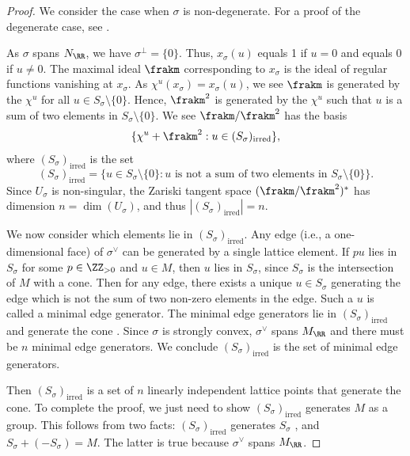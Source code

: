 \documentclass[12pt]{amsart}
\theoremstyle{plain}
\theoremstyle{definition}
\begin{document}
\begin{proof}
We consider the case when $\sigma$ is non-degenerate. For a proof of the degenerate case, see \cite[\S 2.1]{Fulton93}.

As $\sigma$ spans $N_\RR$, we have $\sigma^\perp = \{0\}$.
Thus, $x_\sigma(u)$ equals 1 if $u=0$ and equals 0 if $u \ne 0$.
The maximal ideal $\frakm$ corresponding to $x_\sigma$ is the ideal of regular functions vanishing at $x_\sigma$.
As $\chi^u(x_\sigma) = x_\sigma(u)$, we see $\frakm$ is generated by the $\chi^u$ for all $u \in S_\sigma \setminus \{0\}$.
Hence, $\frakm^2$ is generated by the $\chi^u$ such that $u$ is a sum of two elements in $S_\sigma \setminus \{0\}$.
We see $\frakm / \frakm^2$ has the basis 
$$\{\chi^u + \frakm^2 : u \in (S_\sigma)_{\text{irred}}\},$$
where $(S_\sigma)_{\text{irred}}$ is the set
$$(S_\sigma)_{\text{irred}} = \{u \in S_\sigma \setminus \{0\} : u \text{ is not a sum of two elements in } S_\sigma\setminus\{0\}\}.$$
Since $U_\sigma$ is non-singular, the Zariski tangent space $(\frakm/\frakm^2)^*$ has dimension $n = \dim(U_\sigma)$, and thus $|(S_\sigma)_{\text{irred}}| = n$.

We now consider which elements lie in $(S_\sigma)_{\text{irred}}$.
Any edge (i.e., a one-dimensional face) of $\sigma^\vee$ can be generated by a single lattice element.
If $p u$ lies in $S_\sigma$ for some $p \in \ZZ_{> 0}$ and $u \in M$, then $u$ lies in $S_\sigma$, since $S_\sigma$ is the intersection of $M$ with a cone.
Then for any edge, there exists a unique $u \in S_\sigma$ generating the edge which is not the sum of two non-zero elements in the edge.
Such a $u$ is called a minimal edge generator.
The minimal edge generators lie in $(S_\sigma)_{\text{irred}}$ \cite[Proposition 1.2.23]{CLS11} and generate the cone \cite[Lemma 1.2.15]{CLS11}.
Since $\sigma$ is strongly convex, $\sigma^\vee$ spans $M_\RR$ and there must be $n$ minimal edge generators.
We conclude $(S_\sigma)_{\text{irred}}$ is the set of minimal edge generators.

Then $(S_\sigma)_{\text{irred}}$ is a set of $n$ linearly independent lattice points that generate the cone.
To complete the proof, we just need to show $(S_\sigma)_{\text{irred}}$ generates $M$ as a group.
This follows from two facts: $(S_\sigma)_{\text{irred}}$ generates $S_\sigma$ \cite[Proposition 1.2.23]{CLS11}, and $S_\sigma + (-S_\sigma) = M$.
The latter is true because $\sigma^\vee$ spans $M_\RR$.
\end{proof}
\end{document}
